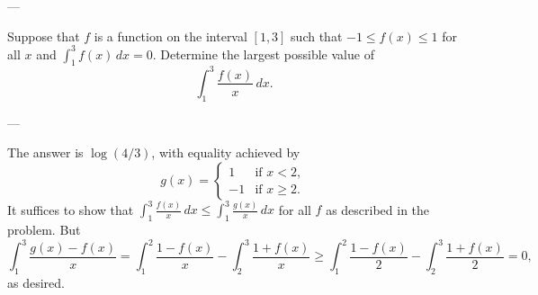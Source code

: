 
---

Suppose that $f$ is a function on the interval $[1,3]$ such that $-1\le f(x)\le1$ for all $x$ and $\int_1^3f(x)\,dx=0$. Determine the largest possible value of \[\int_1^3\frac{f(x)}x\,dx.\]

---

The answer is $\log(4/3)$, with equality achieved by \[g(x)=\begin{cases}
        1&\text{if }x<2,\\
        -1&\text{if }x\ge2.
\end{cases}\]
It suffices to show that $\int_1^3\frac{f(x)}x\,dx\le\int_1^3\frac{g(x)}x\,dx$ for all $f$ as described in the problem. But \[\int_1^3\frac{g(x)-f(x)}x=\int_1^2\frac{1-f(x)}x-\int_2^3\frac{1+f(x)}x\ge\int_1^2\frac{1-f(x)}2-\int_2^3\frac{1+f(x)}2=0,\]
as desired.

